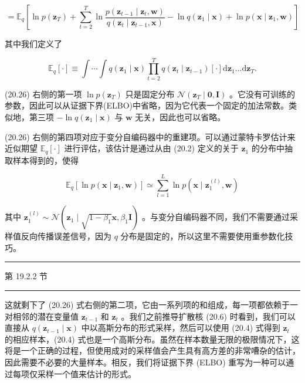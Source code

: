 \documentclass[10pt]{article}
\newcommand{\HRule}{\begin{center}\rule{0.9\linewidth}{0.2mm}\end{center}}
\begin{document}
\[
= {\mathbb{E}}_{q}\left\lbrack  {\ln p\left( {\mathbf{z}}_{T}\right)  + \mathop{\sum }\limits_{{t = 2}}^{T}\ln \frac{p\left( {{\mathbf{z}}_{t - 1} \mid  {\mathbf{z}}_{t},\mathbf{w}}\right) }{q\left( {{\mathbf{z}}_{t} \mid  {\mathbf{z}}_{t - 1},\mathbf{x}}\right) } - \ln q\left( {{\mathbf{z}}_{1} \mid  \mathbf{x}}\right)  + \ln p\left( {\mathbf{x} \mid  {\mathbf{z}}_{1},\mathbf{w}}\right) }\right\rbrack   \tag{20.26}
\]

其中我们定义了

\[
{\mathbb{E}}_{q}\left\lbrack  \cdot \right\rbrack   \equiv  \int \cdots \int q\left( {{\mathbf{z}}_{1} \mid  \mathbf{x}}\right) \mathop{\prod }\limits_{{t = 2}}^{T}q\left( {{\mathbf{z}}_{t} \mid  {\mathbf{z}}_{t - 1}}\right) \left\lbrack  \cdot \right\rbrack  \mathrm{d}{\mathbf{z}}_{1}\ldots \mathrm{d}{\mathbf{z}}_{T}. \tag{20.27}
\]

(20.26) 右侧的第一项 \(\ln p\left( {\mathbf{z}}_{T}\right)\) 只是固定分布 \(\mathcal{N}\left( {{\mathbf{z}}_{T} \mid  \mathbf{0},\mathbf{I}}\right)\) 。它没有可训练的参数，因此可以从证据下界(ELBO)中省略，因为它代表一个固定的加法常数。类似地，第三项 \(- \ln q\left( {{\mathbf{z}}_{1} \mid  \mathbf{x}}\right)\) 与 \(\mathbf{w}\) 无关，因此也可以省略。

(20.26) 右侧的第四项对应于变分自编码器中的重建项。可以通过蒙特卡罗估计来近似期望 \({\mathbb{E}}_{q}\left\lbrack  \cdot \right\rbrack\) 进行评估，该估计是通过从由 (20.2) 定义的关于 \({\mathbf{z}}_{1}\) 的分布中抽取样本得到的，使得

\[
{\mathbb{E}}_{q}\left\lbrack  {\ln p\left( {\mathbf{x} \mid  {\mathbf{z}}_{1},\mathbf{w}}\right) }\right\rbrack   \simeq  \mathop{\sum }\limits_{{l = 1}}^{L}\ln p\left( {\mathbf{x} \mid  {\mathbf{z}}_{1}^{\left( l\right) },\mathbf{w}}\right)  \tag{20.28}
\]

其中 \({\mathbf{z}}_{1}^{\left( l\right) } \sim  \mathcal{N}\left( {{\mathbf{z}}_{1} \mid  \sqrt{1 - {\beta }_{1}}\mathbf{x},{\beta }_{1}\mathbf{I}}\right)\) 。与变分自编码器不同，我们不需要通过采样值反向传播误差信号，因为 \(q\) 分布是固定的，所以这里不需要使用重参数化技巧。

\HRule

第 19.2.2 节

\HRule

这就剩下了 (20.26) 式右侧的第二项，它由一系列项的和组成，每一项都依赖于一对相邻的潜在变量值 \({\mathbf{z}}_{t - 1}\) 和 \({\mathbf{z}}_{t}\) 。我们之前推导扩散核 (20.6) 时看到，我们可以直接从 \(q\left( {{\mathbf{z}}_{t - 1} \mid  \mathbf{x}}\right)\) 中以高斯分布的形式采样，然后可以使用 (20.4) 式得到 \({\mathbf{z}}_{t}\) 的相应样本，(20.4) 式也是一个高斯分布。虽然在样本数量无限的极限情况下，这将是一个正确的过程，但使用成对的采样值会产生具有高方差的非常嘈杂的估计，因此需要不必要的大量样本。相反，我们将证据下界 (ELBO) 重写为一种可以通过每项仅采样一个值来估计的形式。
\end{document}
